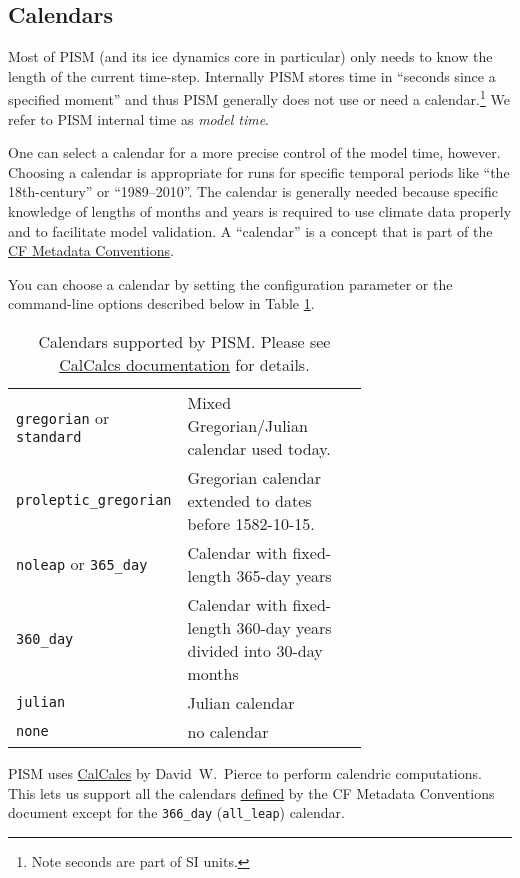 \subsection{Calendars}
\label{sec:calendars}

Most of PISM (and its ice dynamics core in particular) only needs to know the length of the current time-step.  Internally PISM stores time in ``seconds since a specified moment'' and thus PISM generally does not use or need a calendar.\footnote{Note seconds are part of SI units.}  We refer to PISM internal time as \emph{model time}.

One can select a calendar for a more precise control of the model time, however.  Choosing a calendar is appropriate for runs for specific temporal periods like ``the 18th-century'' or ``1989--2010''.  The calendar is generally needed because  specific knowledge of lengths of months and years is required to use climate data properly and to facilitate model validation.  A ``calendar'' is a concept that is part of the \href{http://cf-pcmdi.llnl.gov/documents/cf-conventions/1.6/cf-conventions.html}{CF Metadata Conventions}.

You can choose a calendar by setting the  configuration
parameter or the command-line options described below in Table \ref{tab:calendars}.

\begin{table}
  \centering
  \begin{tabular}{lp{0.7\linewidth}}
    \texttt{gregorian} or \texttt{standard} & Mixed Gregorian/Julian calendar used today.\\
    \texttt{proleptic_gregorian} & Gregorian calendar extended to dates before 1582-10-15.\\
    \texttt{noleap} or \texttt{365_day} & Calendar with fixed-length 365-day years\\
    \texttt{360_day} & Calendar with fixed-length 360-day years divided into 30-day months\\
    \texttt{julian} & Julian calendar \\
    \texttt{none} & no calendar\\
  \end{tabular}
  \caption{Calendars supported by PISM. Please see \href{http://meteora.ucsd.edu/~pierce/calcalcs/calendars.html}{CalCalcs documentation} for details.}
  \label{tab:calendars}
\end{table}

PISM uses
\href{http://meteora.ucsd.edu/~pierce/calcalcs/index.html}{CalCalcs}
by David~W.~Pierce to perform calendric computations. This lets us
support all the calendars
\href{http://cf-pcmdi.llnl.gov/documents/cf-conventions/1.6/cf-conventions.html#calendar}{defined}
by the CF Metadata Conventions document except for the
\texttt{366_day} (\texttt{all_leap}) calendar.

